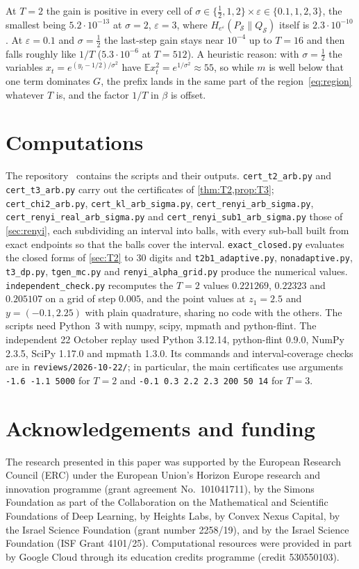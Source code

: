 \documentclass[11pt]{amsart}
\theoremstyle{definition}
\theoremstyle{remark}
\newcommand{\E}{\mathbb E}
\newcommand{\He}{H_{e^{\varepsilon}}}
\begin{document}
At $T=2$ the gain is positive in every cell of $\sigma\in\{\frac12,1,2\}\times\varepsilon\in\{0.1,1,2,3\}$, the smallest being $5.2\cdot10^{-13}$ at $\sigma=2$, $\varepsilon=3$, where $\He(P_{\mathcal S}\|Q_{\mathcal S})$ itself is $2.3\cdot10^{-10}$. At $\varepsilon=0.1$ and $\sigma=\frac12$ the last-step gain stays near $10^{-4}$ up to $T=16$ and then falls roughly like $1/T$ ($5.3\cdot10^{-6}$ at $T=512$). A heuristic reason: with $\sigma=\frac12$ the variables $x_t=e^{(y_t-1/2)/\sigma^2}$ have $\E x_t^2=e^{1/\sigma^2}\approx55$, so while $m$ is well below that one term dominates $G$, the prefix lands in the same part of the region~\eqref{eq:region} whatever $T$ is, and the factor $1/T$ in $\beta$ is offset.

\section{Computations}\label{sec:checks}

{\sloppy The repository~\cite{code} contains the scripts and their outputs. \texttt{cert\_t2\_arb.py} and \texttt{cert\_t3\_arb.py} carry out the certificates of \cref{thm:T2,prop:T3}; \texttt{cert\_chi2\_arb.py}, \texttt{cert\_kl\_arb\_sigma.py}, \texttt{cert\_renyi\_arb\_sigma.py}, \texttt{cert\_renyi\_real\_arb\_sigma.py} and \texttt{cert\_renyi\_sub1\_arb\_sigma.py} those of \cref{sec:renyi}, each subdividing an interval into balls, with every sub-ball built from exact endpoints so that the balls cover the interval. \texttt{exact\_closed.py} evaluates the closed forms of \cref{sec:T2} to $30$ digits and \texttt{t2b1\_adaptive.py}, \texttt{nonadaptive.py}, \texttt{t3\_dp.py}, \texttt{tgen\_mc.py} and \texttt{renyi\_alpha\_grid.py} produce the numerical values. \texttt{independent\_check.py} recomputes the $T=2$ values $0.221269$, $0.22323$ and $0.205107$ on a grid of step $0.005$, and the point values at $z_1=2.5$ and $y=(-0.1,2.25)$ with plain quadrature, sharing no code with the others. The scripts need Python~3 with numpy, scipy, mpmath and python-flint. The independent 22 October replay used Python 3.12.14, python-flint 0.9.0, NumPy 2.3.5, SciPy 1.17.0 and mpmath 1.3.0. Its commands and interval-coverage checks are in \texttt{reviews/2026-10-22/}; in particular, the main certificates use arguments \texttt{-1.6 -1.1 5000} for $T=2$ and \texttt{-0.1 0.3 2.2 2.3 200 50 14} for $T=3$.\par}

\section*{Acknowledgements and funding}
The research presented in this paper was supported by the European Research
Council (ERC) under the European Union's Horizon Europe research and
innovation programme (grant agreement No.~101041711), by the Simons
Foundation as part of the Collaboration on the Mathematical and Scientific
Foundations of Deep Learning, by Heights Labs, by Convex Nexus Capital, by
the Israel Science Foundation (grant number 2258/19), and by the Israel
Science Foundation (ISF Grant 4101/25). Computational resources were
provided in part by Google Cloud through its education credits programme
(credit 530550103).
\end{document}
